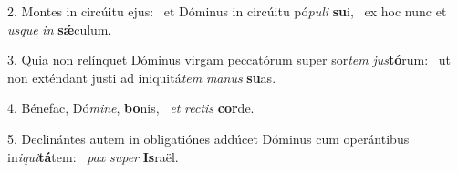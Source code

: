 2. Montes in circúitu ejus: \dag\  et Dóminus in circúitu pó\textit{pu}\textit{li} \textbf{su}i, \ast\  ex hoc nunc et \textit{us}\textit{que} \textit{in} \textbf{sǽ}culum.\

3. Quia non relínquet Dóminus virgam peccatórum super sor\textit{tem} \textit{jus}\textbf{tó}rum: \ast\  ut non exténdant justi ad iniquitá\textit{tem} \textit{ma}\textit{nus} \textbf{su}as.\

4. Bénefac, Dó\textit{mi}\textit{ne}, \textbf{bo}nis, \ast\  \textit{et} \textit{rec}\textit{tis} \textbf{cor}de.\

5. Declinántes autem in obligatiónes addúcet Dóminus cum operántibus in\textit{i}\textit{qui}\textbf{tá}tem: \ast\  \textit{pax} \textit{su}\textit{per} \textbf{Is}raël.\

